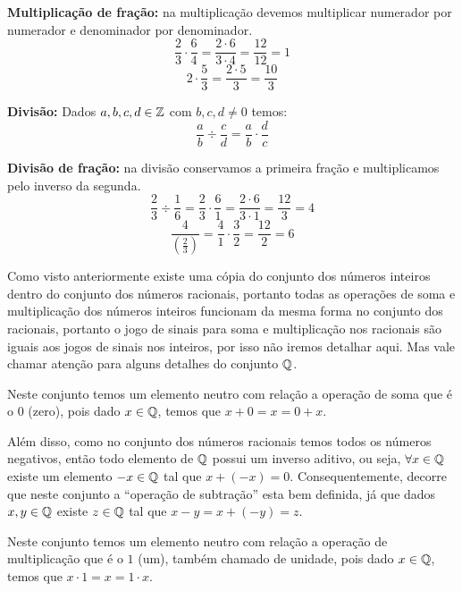  \vskip0.3cm
 \begin{exem}
  \textbf{Multiplicação de fração:} na multiplicação devemos multiplicar numerador por numerador e denominador por denominador.
   \[\frac{2}{3} \cdot \frac{6}{4}= \frac{2 \cdot 6}{3 \cdot 4}= \frac{12}{12}= 1 \]
   \[2 \cdot \frac{5}{3}= \frac{2 \cdot 5}{3}= \frac{10}{3}\]
 \end{exem}

 \vskip0.3cm

 \colorbox{azul}{
 \begin{minipage}{0.9\linewidth}
 \begin{center}
  \textbf{Divisão:} Dados $a, b, c, d \in \mathbb{Z}$ com $b, c, d \neq 0$ temos:
 \[\frac{a}{b} \div \frac{c}{d}= \frac{a}{b} \cdot \frac{d}{c} \]
 \end{center}
 \end{minipage}}

 \vskip0.3cm
 \begin{exem}
  \textbf{Divisão de fração:} na divisão conservamos a primeira fração e multiplicamos pelo inverso da segunda.
   \[\frac{2}{3} \div \frac{1}{6}= \frac{2}{3} \cdot \frac{6}{1}= \frac{2 \cdot 6}{3 \cdot 1}= \frac{12}{3}= 4 \]
   \[\frac{4}{\left(\frac{2}{3}\right)}= \frac{4}{1} \cdot \frac{3}{2}= \frac{12}{2}=6\]
 \end{exem}

 Como visto anteriormente existe uma cópia do conjunto dos números inteiros dentro do conjunto dos números racionais, portanto todas as operações de soma e multiplicação dos números inteiros funcionam da mesma forma no conjunto dos racionais, portanto o jogo de sinais para soma e multiplicação nos racionais são iguais aos jogos de sinais nos inteiros, por isso não iremos detalhar aqui. Mas vale chamar atenção para alguns detalhes do conjunto $\mathbb{Q}$.

   Neste conjunto temos um elemento neutro com relação a operação de soma que é o $0$ (zero), pois dado $x \in \mathbb{Q}$, temos que $x+0= x= 0+x$.

 Além disso, como no conjunto dos números racionais temos todos os números negativos, então todo elemento de $\mathbb{Q}$ possui um inverso aditivo, ou seja, $\forall x \in \mathbb{Q}$ existe um elemento $-x \in \mathbb{Q}$ tal que $x + (-x)=0$. Consequentemente, decorre que neste conjunto a ``operação de subtração'' esta bem definida, já que dados $x, y \in \mathbb{Q}$ existe $z \in \mathbb{Q}$ tal que $x - y= x+ (-y)= z$.

 Neste conjunto temos um elemento neutro com relação a operação de multiplicação que é o $1$ (um), também chamado de unidade, pois dado $x \in \mathbb{Q}$, temos que $x \cdot 1= x= 1 \cdot x$.

